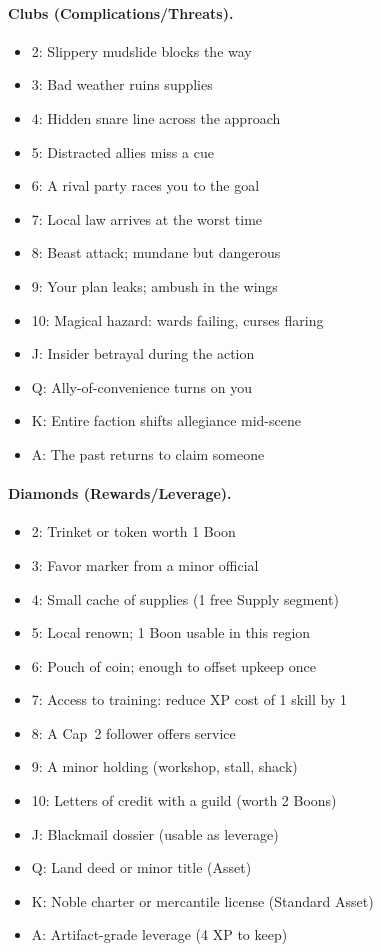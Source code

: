 \documentclass[12pt]{article}
\begin{document}
\paragraph{Clubs (Complications/Threats).}
\begin{itemize}
  \item 2: Slippery mudslide blocks the way
  \item 3: Bad weather ruins supplies
  \item 4: Hidden snare line across the approach
  \item 5: Distracted allies miss a cue
  \item 6: A rival party races you to the goal
  \item 7: Local law arrives at the worst time
  \item 8: Beast attack; mundane but dangerous
  \item 9: Your plan leaks; ambush in the wings
  \item 10: Magical hazard: wards failing, curses flaring
  \item J: Insider betrayal during the action
  \item Q: Ally-of-convenience turns on you
  \item K: Entire faction shifts allegiance mid-scene
  \item A: The past returns to claim someone
\end{itemize}

\paragraph{Diamonds (Rewards/Leverage).}
\begin{itemize}
  \item 2: Trinket or token worth 1 Boon
  \item 3: Favor marker from a minor official
  \item 4: Small cache of supplies (1 free Supply segment)
  \item 5: Local renown; 1 Boon usable in this region
  \item 6: Pouch of coin; enough to offset upkeep once
  \item 7: Access to training: reduce XP cost of 1 skill by 1
  \item 8: A Cap~2 follower offers service
  \item 9: A minor holding (workshop, stall, shack)
  \item 10: Letters of credit with a guild (worth 2 Boons)
  \item J: Blackmail dossier (usable as leverage)
  \item Q: Land deed or minor title (Asset)
  \item K: Noble charter or mercantile license (Standard Asset)
  \item A: Artifact-grade leverage (4 XP to keep)
\end{itemize}
\end{document}
